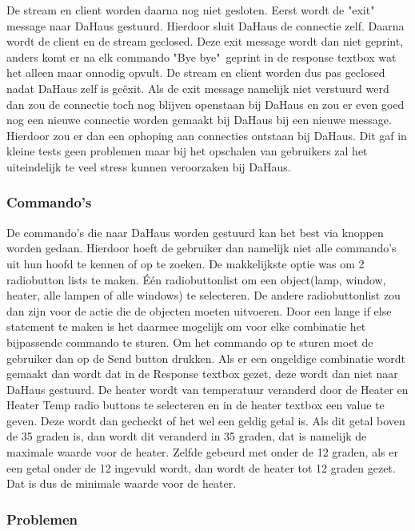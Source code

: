\documentclass[11pt]{article}
\begin{document}
	De stream en client worden daarna nog niet gesloten. Eerst wordt de "exit" message naar DaHaus gestuurd. Hierdoor sluit DaHaus de connectie zelf. Daarna wordt de client en de stream geclosed. Deze exit message wordt dan niet geprint, anders komt er na elk commando "Bye bye"\  geprint in de response textbox wat het alleen maar onnodig opvult. De stream en client worden dus pas geclosed nadat DaHaus zelf is ge\"{e}xit. Als de exit message namelijk niet verstuurd werd dan zou de connectie toch nog blijven openstaan bij DaHaus en zou er even goed nog een nieuwe connectie worden gemaakt bij DaHaus bij een nieuwe message. Hierdoor zou er dan een ophoping aan connecties ontstaan bij DaHaus. Dit gaf in kleine tests geen problemen maar bij het opschalen van gebruikers zal het uiteindelijk te veel stress kunnen veroorzaken bij DaHaus. 
	\subsubsection{Commando's}
	
	De commando's die naar DaHaus worden gestuurd kan het best via knoppen worden gedaan. Hierdoor hoeft de gebruiker dan namelijk niet alle commando's uit hun hoofd te kennen of op te zoeken. De makkelijkste optie was om 2 radiobutton lists te maken. \'{E}\'{e}n radiobuttonlist om een object(lamp, window, heater, alle lampen of alle windows) te selecteren. De andere radiobuttonlist zou dan zijn voor de actie die de objecten moeten uitvoeren. Door een lange if else statement te maken is het daarmee mogelijk om voor elke combinatie het bijpassende commando te sturen. Om het commando op te sturen moet de gebruiker dan op de Send button drukken. Als er een ongeldige combinatie wordt gemaakt dan wordt dat in de Response textbox gezet, deze wordt dan niet naar DaHaus gestuurd. De heater wordt van temperatuur veranderd door de Heater en Heater Temp radio buttons te selecteren en in de heater textbox een value te geven. Deze wordt dan gecheckt of het wel een geldig getal is. Als dit getal boven de 35 graden is, dan wordt dit veranderd in 35 graden, dat is namelijk de maximale waarde voor de heater. Zelfde gebeurd met onder de 12 graden, als er een getal onder de 12 ingevuld wordt, dan wordt de heater tot 12 graden gezet. Dat is dus de minimale waarde voor de heater. 
	\subsubsection{Problemen}
	
\end{document}
